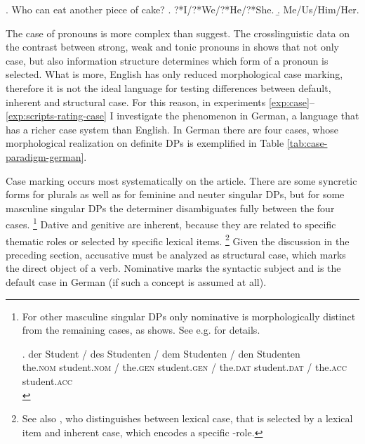 \ex. Who can eat another piece of cake? \hfill \citep[77]{barton.progovac2005} 
\a. ?*I/?*We/?*He/?*She.
\b. Me/Us/Him/Her.

The case of pronouns is more complex than \citet{barton.progovac2005} suggest. The crosslinguistic data on the contrast between strong, weak and tonic pronouns in \citet{merchant2004} shows that not only case, but also information structure determines which form of a pronoun is selected. What is more, English has only reduced morphological case marking, therefore it is not the ideal language for testing differences between default, inherent and structural case. For this reason, in experiments \ref{exp:case}--\ref{exp:scripts-rating-case} I investigate the phenomenon in German, a language that has a richer case system than English. In German there are four cases, whose morphological realization on definite DPs is exemplified in Table \ref{tab:case-paradigm-german}.

Case marking occurs most systematically on the article. There are some syncretic forms for plurals as well as for feminine and neuter singular DPs, but for some masculine singular DPs the determiner disambiguates fully between the four cases.%
%
\footnote{For other masculine singular DPs only nominative is morphologically distinct from the remaining cases, as \Next shows. See e.g. \citet[139--141]{eisenberg1999} for details.

\exg. der Student / des Studenten / dem Studenten /  den Studenten\\
      the.\textsc{nom} student.\textsc{nom} /  the.\textsc{gen} student.\textsc{gen} / the.\textsc{dat} student.\textsc{dat} /  the.\textsc{acc} student.\textsc{acc}\\


}\afterfn%
%
Dative and genitive are inherent, because they are related to specific thematic roles or selected by specific lexical items.%
%
\footnote{See also \citet{woolford2006}, who distinguishes between lexical case, that is selected by a lexical item and inherent case, which encodes a specific \texttheta-role.}\afterfn%
% 
Given the discussion in the preceding section, accusative must be analyzed as structural case, which marks the direct object of a verb. Nominative marks the syntactic subject and is the default case in German (if such a concept is assumed at all).


